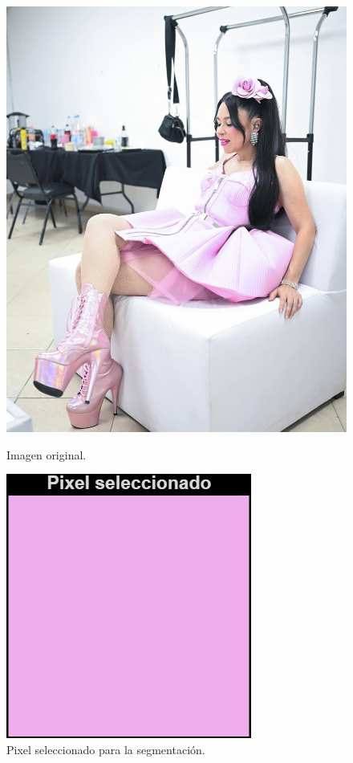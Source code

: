 \documentclass[11pt, letterpaper]{article}
\begin{document}
\begin{figure}[h!]
	\begin{minipage}{0.4\textwidth}
		\centering
		\includegraphics[width=\textwidth]{IMG/IM4.jpeg}
		\caption*{Imagen original.}
	\end{minipage}\hfill
	\begin{minipage}{0.4\textwidth}
		\centering
		\includegraphics[width=\textwidth]{IMG/PIXEL.jpg}
		\caption*{Pixel seleccionado para la segmentación.}
	\end{minipage}
	

\end{figure}
\end{document}
